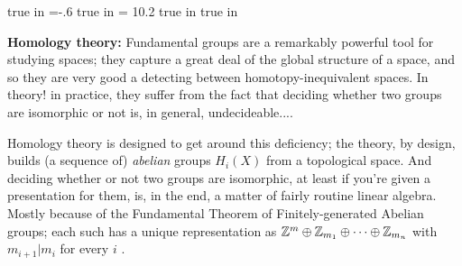 

\overfullrule=0pt
\parindent=0pt

\nopagenumbers




 true in
\hoffset=-.6 true in
\hsize = 10.2 true in
 true in



\def\cltr{\Red}		  %

\loadmsbm



\def\ctln{\centerline}
\def\u{\underbar}
\def\ssk{\smallskip}
\def\msk{\medskip}
\def\bsk{\bigskip}
\def\hsk{\hskip.1in}
\def\hhsk{\hskip.2in}
\def\dsl{\displaystyle}
\def\hskp{\hskip1.5in}

\def\lra{$\Leftrightarrow$ }
\def\ra{\rightarrow}
\def\mpto{\logmapsto}
\def\pu{\pi_1}
\def\mpu{$\pi_1$}
\def\sig{\Sigma}
\def\msig{$\Sigma$}
\def\ep{\epsilon}
\def\sset{\subseteq}
\def\del{\partial}
\def\inv{^{-1}}
\def\wtl{\widetilde}
\def\del{\partial}
\def\delp{\partial^\prime}
\def\delpp{\partial^{\prime\prime}}
\def\sgn{{\roman{sgn}}}
\def\wtih{\widetilde{H}}
\def\bbz{{\Bbb Z}}
\def\bbr{{\Bbb R}}
\def\rtar{$\Rightarrow$}

\def\cltr{\Red}		  %
\def\cltb{\Blue}		  %
\def\cltg{\PineGreen}	  %





{\bf Homology theory:} Fundamental groups are a remarkably powerful
tool for studying spaces; they capture a great deal of the global
structure of a space, and so they are very good a detecting
between homotopy-inequivalent spaces. In theory! \cltr{{\bf But}} in practice,
they suffer from the fact that deciding whether two groups are 
isomorphic or not is, in general, undecideable.... 

\msk

Homology theory
is designed to get around this deficiency; the theory, by design,
builds (a sequence of) {\it abelian} groups $H_i(X)$ from a topological
space. And deciding whether or not two \u{abelian} groups are isomorphic, at least
if you're given a presentation for them, is, in the end, a matter of
fairly routine linear algebra. Mostly because of the Fundamental Theorem
of Finitely-generated Abelian groups; each such has a unique representation
as ${\Bbb Z}^m\oplus{\Bbb Z}_{m_1}\oplus\cdots\oplus{\Bbb Z}_{m_n}$
with $m_{i+1}|m_i$ for every $i$ .

